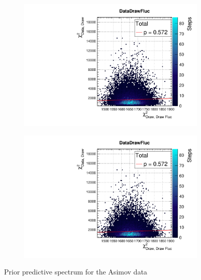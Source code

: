 \begin{figure}[!h]
	\begin{subfigure}[t]{0.49\textwidth}
		\includegraphics[width=\textwidth, trim={0mm 0mm 0mm 11mm}, clip,page=1]{figures/mach3/Asimov/2017b_NewDet_3Xsec_4Det_5Flux_NewXSecTune_Asimov_merge_PriorPred_procs}
	\end{subfigure}
	\begin{subfigure}[t]{0.49\textwidth}
		\includegraphics[width=\textwidth, trim={0mm 0mm 0mm 11mm}, clip,page=2]{figures/mach3/Asimov/2017b_NewDet_3Xsec_4Det_5Flux_NewXSecTune_Asimov_merge_PriorPred_procs}
	\end{subfigure}
\caption{Prior predictive spectrum for the Asimov data}
\label{fig:prior_predictive_asimov}
\end{figure}

